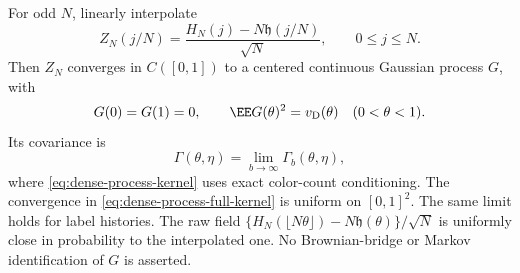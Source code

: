 \documentclass[11pt,letterpaper]{article}
\begin{document}
\begin{theorem}
\label{thm:dense-history-process}
For odd $N$, linearly interpolate
\[
 Z_N(j/N)=\frac{H_N(j)-N\mathfrak h(j/N)}{\sqrt N},
                         \qquad 0\le j\le N.
\]
Then $Z_N$ converges in $C([0,1])$ to a centered continuous
Gaussian process $G$, with
\[
 G(0)=G(1)=0,\qquad
 \EE G(\theta)^2=v_{\rm D}(\theta)\quad(0<\theta<1).
\]
Its covariance is
\begin{equation}\label{eq:dense-process-full-kernel}
 \Gamma(\theta,\eta)=\lim_{b\to\infty}\Gamma_b(\theta,\eta),
\end{equation}
where \eqref{eq:dense-process-kernel} uses exact color-count
conditioning. The convergence in
\eqref{eq:dense-process-full-kernel} is uniform on $[0,1]^2$.
The same limit holds for label histories.
The raw field
$\{H_N(\lfloor N\theta\rfloor)-N\mathfrak h(\theta)\}/\sqrt N$
is uniformly close in probability to the interpolated one.
No Brownian-bridge or Markov identification of $G$ is asserted.
\end{theorem}
\end{document}
